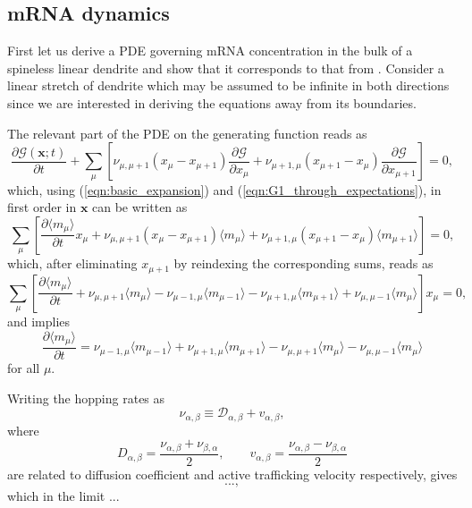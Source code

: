 \documentclass[a4paper, 11pt]{article}
\begin{document}
\subsection{mRNA dynamics}


First let us derive a PDE governing mRNA concentration in the bulk of a spineless linear dendrite and show that it corresponds to that from \cite{PMID:31350097}. Consider a linear stretch of dendrite which may be assumed to be infinite in both directions since we are interested in deriving the equations away from its boundaries.

The relevant part of the PDE on the generating function reads as
\begin{equation*}
  \frac{\partial\mathcal G(\mathbf x; t)}{\partial t} + \sum_\mu\left[\nu_{\mu, \mu+1}(x_\mu - x_{\mu+1})\frac{\partial\mathcal G}{\partial x_\mu} + \nu_{\mu+1,\mu}(x_{\mu+1} - x_\mu)\frac{\partial\mathcal G}{\partial x_{\mu+1}}\right] = 0,
\end{equation*}
which, using (\ref{eqn:basic_expansion}) and (\ref{eqn:G1_through_expectations}), in first order in $\mathbf x$ can be written as
\begin{equation*}
  \sum_\mu\left[\frac{\partial\langle m_\mu \rangle}{\partial t}x_\mu + \nu_{\mu, \mu+1}(x_\mu - x_{\mu+1})\langle m_\mu\rangle + \nu_{\mu+1,\mu}(x_{\mu+1} - x_\mu)\langle m_{\mu+1}\rangle\right] = 0,
\end{equation*}
which, after eliminating $x_{\mu+1}$ by reindexing the corresponding sums, reads as
\begin{equation}
  \sum_\mu\left[\frac{\partial\langle m_\mu \rangle}{\partial t} + \nu_{\mu,\mu+1}\langle m_\mu\rangle - \nu_{\mu-1,\mu}\langle m_{\mu-1}\rangle - \nu_{\mu+1,\mu} \langle m_{\mu+1}\rangle + \nu_{\mu,\mu-1}\langle m_\mu\rangle \right]x_\mu = 0,
\end{equation}
and implies
\begin{equation}
  \frac{\partial\langle m_\mu \rangle}{\partial t} = \nu_{\mu-1,\mu}\langle m_{\mu-1}\rangle + \nu_{\mu+1,\mu} \langle m_{\mu+1}\rangle - \nu_{\mu,\mu+1}\langle m_\mu\rangle - \nu_{\mu,\mu-1}\langle m_\mu\rangle
\end{equation}
for all $\mu$.

Writing the hopping rates as
\begin{equation*}
  \nu_{\alpha,\beta} \equiv \mathcal D_{\alpha,\beta} + v_{\alpha,\beta},
\end{equation*}
where
\begin{equation*}
  D_{\alpha,\beta} = \frac{\nu_{\alpha,\beta} + \nu_{\beta,\alpha}}{2}, \qquad v_{\alpha,\beta} = \frac{\nu_{\alpha,\beta} - \nu_{\beta,\alpha}}{2}
\end{equation*}
are related to diffusion coefficient and active trafficking velocity respectively, gives
\begin{equation}
  ...,
\end{equation}
which in the limit ...
\end{document}
